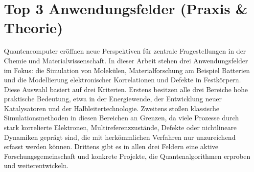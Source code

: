 \section{Top 3 Anwendungsfelder (Praxis \& Theorie)}
{Quantencomputer eröffnen neue Perspektiven für zentrale Fragestellungen in der Chemie und Materialwissenschaft. In dieser Arbeit stehen drei Anwendungsfelder im Fokus: die Simulation von Molekülen, Materialforschung am Beispiel Batterien und die Modellierung elektronischer Korrelationen und Defekte in Festkörpern.
Diese Auswahl basiert auf drei Kriterien. Erstens besitzen alle drei Bereiche hohe praktische Bedeutung, etwa in der Energiewende, der Entwicklung neuer Katalysatoren und der Halbleitertechnologie. Zweitens stoßen klassische Simulationsmethoden in diesen Bereichen an Grenzen, da viele Prozesse durch stark korrelierte Elektronen, Multireferenzzustände, Defekte oder nichtlineare Dynamiken geprägt sind, die mit herkömmlichen Verfahren nur unzureichend erfasst werden können. Drittens gibt es in allen drei Feldern eine aktive Forschungsgemeinschaft und konkrete Projekte, die Quantenalgorithmen erproben und weiterentwickeln.
}
